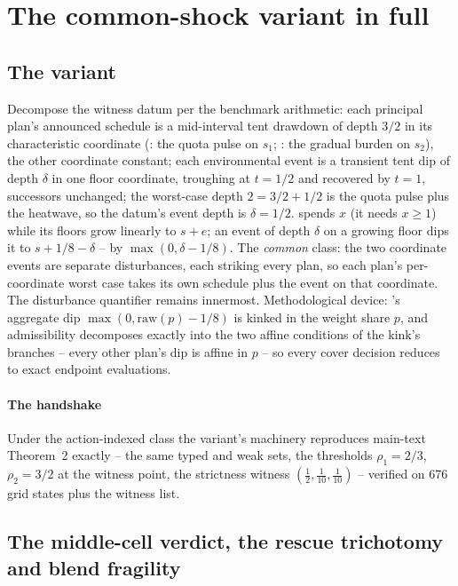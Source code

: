 \section{The common-shock variant in full}\label{si:commonshock}

\subsection{The variant}

Decompose the witness datum per the benchmark arithmetic: each principal plan's announced schedule is a mid-interval tent drawdown of depth $3/2$ in its characteristic coordinate (: the quota pulse on $s_1$; : the gradual burden on $s_2$), the other coordinate constant; each environmental event is a transient tent dip of depth $\delta$ in one floor coordinate, troughing at $t=1/2$ and recovered by $t=1$, successors unchanged; the worst-case depth $2=3/2+1/2$ is the quota pulse plus the heatwave, so the datum's event depth is $\delta=1/2$.  spends $x$ (it needs $x\ge1$) while its floors grow linearly to $s+e$; an event of depth $\delta$ on a growing floor dips it to $s+1/8-\delta$ -- by $\max(0,\delta-1/8)$. The \emph{common} class: the two coordinate events are separate disturbances, each striking every plan, so each plan's per-coordinate worst case takes its own schedule plus the event on that coordinate. The disturbance quantifier remains innermost. Methodological device: 's aggregate dip $\max(0,\mathrm{raw}(p)-1/8)$ is kinked in the weight share $p$, and admissibility decomposes exactly into the two affine conditions of the kink's branches -- every other plan's dip is affine in $p$ -- so every cover decision reduces to exact endpoint evaluations.

\paragraph{The handshake} Under the action-indexed class the variant's machinery reproduces main-text Theorem~2 exactly -- the same typed and weak sets, the thresholds $\rho_1=2/3$, $\rho_2=3/2$ at the witness point, the strictness witness $(\tfrac12,\tfrac1{10},\tfrac1{10})$ -- verified on 676 grid states plus the witness list.

\subsection{The middle-cell verdict, the rescue trichotomy and blend fragility}

